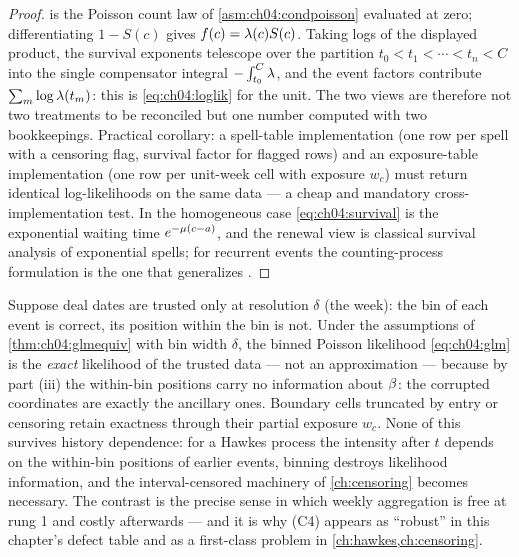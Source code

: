 \begin{proof}
 is the Poisson count law of
\cref{asm:ch04:condpoisson} evaluated at zero; differentiating $1 - S(c)$
gives $f(c) = \lambda(c) S(c)$. Taking logs of the displayed product, the
survival exponents telescope over the partition $t_0 < t_1 < \cdots < t_n
< C$ into the single compensator integral $-\int_{t_0}^{C}\lambda$, and the
event factors contribute $\sum_m \log\lambda(t_m)$: this is
\cref{eq:ch04:loglik} for the unit. The two views are therefore not two
treatments to be reconciled but one number computed with two
bookkeepings. Practical corollary: a spell-table implementation (one row
per spell with a censoring flag, survival factor for flagged rows) and an
exposure-table implementation (one row per unit-week cell with exposure
$w_c$) must return identical log-likelihoods on the same data --- a cheap
and mandatory cross-implementation test. In the homogeneous case
\cref{eq:ch04:survival} is the exponential waiting time $e^{-\mu(c-a)}$,
and the renewal view is classical survival analysis of exponential
spells; for recurrent events the counting-process formulation is the one
that generalizes \citep{cook2007}.
\end{proof}

\begin{corollary}\label{cor:ch04:intervalexact}
Suppose deal dates are trusted only at resolution $\delta$ (the week): the
bin of each event is correct, its position within the bin is not. Under
the assumptions of \cref{thm:ch04:glmequiv} with bin width $\delta$, the
binned Poisson likelihood \cref{eq:ch04:glm} is the \emph{exact}
likelihood of the trusted data --- not an approximation --- because by
part (iii) the within-bin positions carry no information about $\beta$:
the corrupted coordinates are exactly the ancillary ones. Boundary cells
truncated by entry or censoring retain exactness through their partial
exposure $w_c$. None of this survives history dependence: for a Hawkes
process the intensity after $t$ depends on the within-bin positions of
earlier events, binning destroys likelihood information, and the
interval-censored machinery of \cref{ch:censoring}
\citep{rizoiu2022} becomes necessary. The contrast is the precise sense
in which weekly aggregation is free at rung 1 and costly afterwards ---
and it is why (C4) appears as ``robust'' in this chapter's defect table
and as a first-class problem in \cref{ch:hawkes,ch:censoring}.
\end{corollary}

